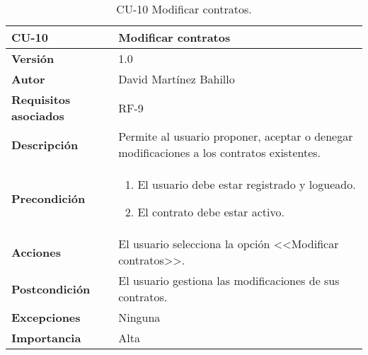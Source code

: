 \begin{table}[p]
	\centering
	\begin{tabularx}{\linewidth}{ p{} p{} }
		\toprule
		\textbf{CU-10}    & \textbf{Modificar contratos}\\
		\midrule
		\textbf{Versión}              & 1.0    \\
		\textbf{Autor}                & David Martínez Bahillo \\
		\textbf{Requisitos asociados} & RF-9 \\
		\textbf{Descripción}          & Permite al usuario proponer, aceptar o denegar modificaciones a los contratos existentes. \\
				\textbf{Precondición}         &  
		\begin{enumerate}
			\item El usuario debe estar registrado y logueado.
			\item El contrato debe estar activo.
		\end{enumerate}\\
		\textbf{Acciones}             & El usuario selecciona la opción <<Modificar contratos>>. \\
		\textbf{Postcondición}        & El usuario gestiona las modificaciones de sus contratos. \\
		\textbf{Excepciones}          & Ninguna \\
		\textbf{Importancia}          & Alta \\
		\bottomrule
	\end{tabularx}
	\caption{CU-10 Modificar contratos.}
\end{table}


